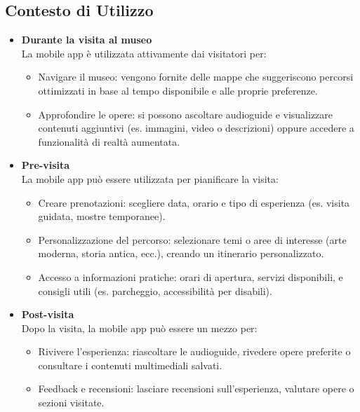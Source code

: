 \documentclass{article}
\begin{document}
\subsection{Contesto di Utilizzo}
\begin{itemize}

\item \textbf{Durante la visita al museo} \\
La mobile app è utilizzata attivamente dai visitatori per:
\begin{itemize}
\item Navigare il museo: vengono fornite delle mappe che suggeriscono percorsi ottimizzati in base al tempo disponibile e alle proprie preferenze.
\item Approfondire le opere: si possono ascoltare audioguide e visualizzare contenuti aggiuntivi (es. immagini, video o descrizioni) oppure accedere a funzionalità di realtà aumentata.
\end{itemize}

\item \textbf{Pre-visita} \\
La mobile app può essere utilizzata per pianificare la visita:
\begin{itemize}
\item Creare prenotazioni: scegliere data, orario e tipo di esperienza (es. visita guidata, mostre temporanee).
\item Personalizzazione del percorso: selezionare temi o aree di interesse (arte moderna, storia antica, ecc.), creando un itinerario personalizzato.
\item Accesso a informazioni pratiche: orari di apertura, servizi disponibili, e consigli utili (es. parcheggio, accessibilità per disabili).
\end{itemize}

\item \textbf{Post-visita} \\
Dopo la visita, la mobile app può essere un mezzo per:
\begin{itemize}
\item Rivivere l’esperienza: riascoltare le audioguide, rivedere opere preferite o consultare i contenuti multimediali salvati.
\item Feedback e recensioni: lasciare recensioni sull’esperienza, valutare opere o sezioni visitate.
\end{itemize}

\end{itemize}
\end{document}
